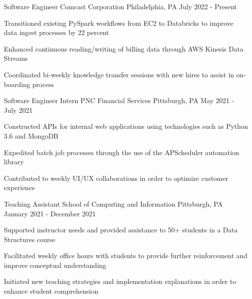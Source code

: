 
\begin{cventries}
    \cventry
    {Software Engineer} %
    {Comcast Corporation} %
    {Philadelphia, PA} %
    {July 2022 - Present} %
    {
      \begin{cvitems} %
        \item {Transitioned existing PySpark workflows from EC2 to Databricks to improve data ingest processes by 22 percent}
        \item {Enhanced continuous reading/writing of billing data through AWS Kinesis Data Streams}
        \item {Coordinated bi-weekly knowledge transfer sessions with new hires to assist in on-boarding process}
      \end{cvitems}
    }
    
  \cventry
    {Software Engineer Intern} %
    {PNC Financial Services} %
    {Pittsburgh, PA} %
    {May 2021 - July 2021} %
    {
      \begin{cvitems} %
        \item {Constructed APIs for internal web applications using technologies such as Python 3.6 and MongoDB}
        \item {Expedited batch job processes through the use of the APScheduler automation library}
        \item {Contributed to weekly UI/UX collaborations in order to optimize customer experience}
      \end{cvitems}
    }

  \cventry
    {Teaching Assistant} %
    {School of Computing and Information} %
    {Pittsburgh, PA} %
    {January 2021 - December 2021} %
    {
      \begin{cvitems} %
        \item {Supported instructor needs and provided assistance to 50+ students in a Data Structures course}
        \item {Facilitated weekly office hours with students to provide further reinforcement and improve conceptual understanding}
        \item {Initiated new teaching strategies and implementation explanations in order to enhance student comprehension}
      \end{cvitems}
    }


\end{cventries}
